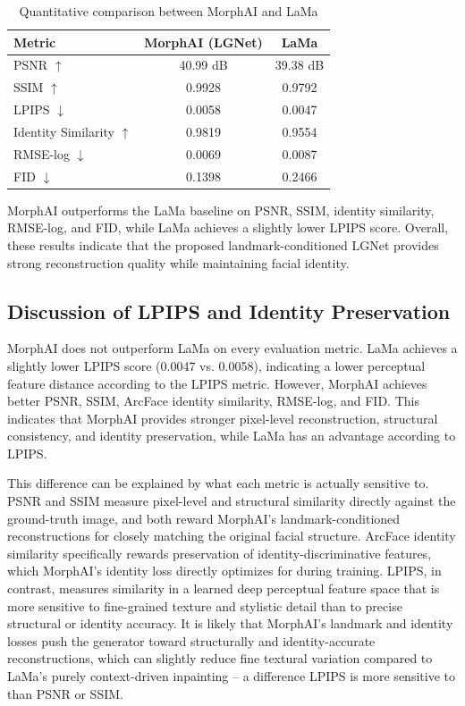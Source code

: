 \begin{table}[H]
\centering
\renewcommand{\arraystretch}{1.3}
\begin{tabular}{|l|c|c|}
\hline
\textbf{Metric} & \textbf{MorphAI (LGNet)} & \textbf{LaMa} \\ \hline
PSNR $\uparrow$ & 40.99 dB & 39.38 dB \\ \hline
SSIM $\uparrow$ & 0.9928 & 0.9792 \\ \hline
LPIPS $\downarrow$ & 0.0058 & 0.0047 \\ \hline
Identity Similarity $\uparrow$ & 0.9819 & 0.9554 \\ \hline
RMSE-log $\downarrow$ & 0.0069 & 0.0087 \\ \hline
FID $\downarrow$ & 0.1398 & 0.2466 \\ \hline
\end{tabular}
\caption{Quantitative comparison between MorphAI and LaMa}
\label{tab:morphai_lama}
\end{table}

\noindent MorphAI outperforms the LaMa baseline on PSNR, SSIM, identity similarity, 
RMSE-log, and FID, while LaMa achieves a slightly lower LPIPS score. Overall, these 
results indicate that the proposed landmark-conditioned LGNet provides strong 
reconstruction quality while maintaining facial identity.

\subsection{Discussion of LPIPS and Identity Preservation}
MorphAI does not outperform LaMa on every evaluation metric. LaMa achieves a slightly 
lower LPIPS score (0.0047 vs. 0.0058), indicating a lower perceptual feature distance 
according to the LPIPS metric. However, MorphAI achieves better PSNR, SSIM, ArcFace 
identity similarity, RMSE-log, and FID. This indicates that MorphAI provides stronger 
pixel-level reconstruction, structural consistency, and identity preservation, while 
LaMa has an advantage according to LPIPS.

\noindent This difference can be explained by what each metric is actually sensitive to. PSNR 
and SSIM measure pixel-level and structural similarity directly against the ground-truth 
image, and both reward MorphAI's landmark-conditioned reconstructions for closely 
matching the original facial structure. ArcFace identity similarity specifically rewards 
preservation of identity-discriminative features, which MorphAI's identity loss directly 
optimizes for during training. LPIPS, in contrast, measures similarity in a learned deep 
perceptual feature space that is more sensitive to fine-grained texture and stylistic 
detail than to precise structural or identity accuracy. It is likely that MorphAI's 
landmark and identity losses push the generator toward structurally and identity-accurate 
reconstructions, which can slightly reduce fine textural variation compared to LaMa's 
purely context-driven inpainting -- a difference LPIPS is more sensitive to than PSNR 
or SSIM.

